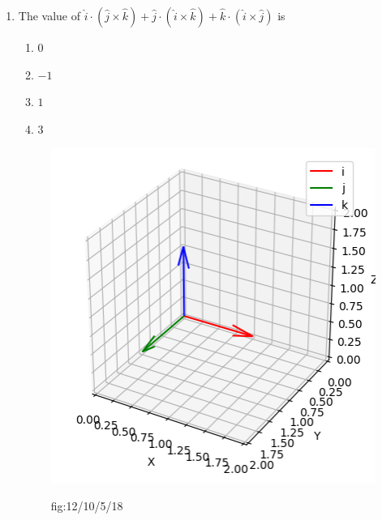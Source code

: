 \begin{enumerate}[label=\thesection.\arabic*,ref=\thesection.\theenumi]
\item  The value of  $\hat{i} \cdot (\hat{j} \times \hat{k})+\hat{j} \cdot (\hat{i} \times \hat{k})+\hat{k} \cdot (\hat{i} \times \hat{j})$ is
\begin{enumerate}
  \item $0$ 
  \item $-1$ 
  \item $1$ 
  \item $3$  
\end{enumerate}
\solution


\begin{figure}[H]
        \centering
  \includegraphics[width=\columnwidth]{chapters/12/10/5/18/figs/unit_vec.png}
                \label{fig:12/10/5/18}
         \caption{fig:12/10/5/18}
               \end{figure}
\end{enumerate}
